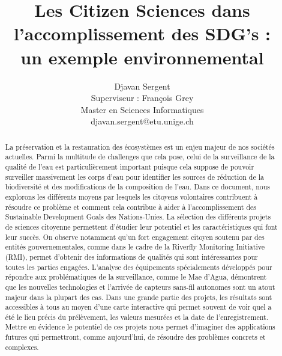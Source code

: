 \documentclass[10pt, article]{llncs}
\begin{document}
%
\title{Les Citizen Sciences dans\\l'accomplissement des SDG's : \\un exemple environnemental}



% 
\author{Djavan Sergent \\
Superviseur : François Grey\\
Master en Sciences Informatiques \\
djavan.sergent@etu.unige.ch}




\maketitle

\begin{abstract}
	La préservation et la restauration des écosystèmes est un enjeu majeur de nos sociétés actuelles. Parmi la multitude de challenges que cela pose, celui de la surveillance de la qualité de l'eau est particulièrement important puisque cela suppose de pouvoir surveiller massivement les corps d'eau pour identifier les sources de réduction de la biodiversité et des modifications de la composition de l'eau. Dans ce document, nous explorons les différents moyens par lesquels les citoyens volontaires contribuent à résoudre ce problème et comment cela contribue à aider à l'accomplissement des Sustainable Development Goals des Nations-Unies. La sélection des différents projets de sciences citoyenne permettent d'étudier leur potentiel et les caractéristiques qui font leur succès. On observe notamment qu'un fort engagement citoyen soutenu par des entités gouvernementales, comme dans le cadre de la Riverfly Monitoring Initiative (RMI), permet d'obtenir des informations de qualités qui sont intéressantes pour toutes les parties engagées. L'analyse des équipements spécialements développés pour répondre aux problématiques de la surveillance, comme le Mae d'Agua, démontrent que les nouvelles technologies et l'arrivée de capteurs sans-fil autonomes sont un atout majeur dans la plupart des cas. Dans une grande partie des projets, les résultats sont accessibles à tous au moyen d'une carte interactive qui permet souvent de voir quel a été le lieu précis du prélèvement, les valeurs mesurées et la date de l'enregistrement. Mettre en évidence le potentiel de ces projets nous permet d'imaginer des applications futures qui permettront, comme aujourd'hui, de résoudre des problèmes concrets et complexes.
\end{abstract}
\end{document}
